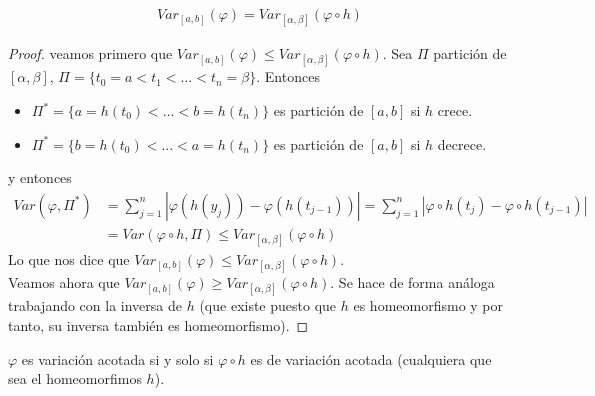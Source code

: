 \begin{obs}
\begin{enumerate}
    \begin{align*}
        Var_{[a,b]}(\varphi) = Var_{[\alpha,\beta]}(\varphi \circ h)
    \end{align*}
    \begin{proof}
    veamos primero que $Var_{[a,b]}(\varphi) \leq Var_{[\alpha,\beta]}(\varphi \circ h)$.
    Sea $\Pi$ partición de $[\alpha,\beta]$, $\Pi = \{t_0 = a < t_1 < ... < t_n = \beta\}$. Entonces
    \begin{itemize}
        \item $\Pi^* = \{ a = h(t_0) < ... < b = h(t_n) \}$ es partición de $[a,b]$ si $h$ crece.
        \item $\Pi^* = \{ b = h(t_0) < ... < a = h(t_n) \}$ es partición de $[a,b]$ si $h$ decrece.
    \end{itemize}
    y entonces
    \begin{align*}
        Var(\varphi,\Pi^*) &= \sum_{j=1}^{n}{|\varphi(h(y_j)) - \varphi(h(t_{j-1}))|} = \sum_{j=1}^{n}{|\varphi \circ h (t_j) - \varphi \circ h (t_{j-1})|} \\
        &= Var(\varphi \circ h, \Pi) \leq Var_{[\alpha,\beta]}(\varphi \circ h)
    \end{align*}
    Lo que nos dice que $Var_{[a,b]}(\varphi) \leq Var_{[\alpha,\beta]}(\varphi \circ h)$. \\
    \newline
    Veamos ahora que $Var_{[a,b]}(\varphi) \ge Var_{[\alpha,\beta]}(\varphi \circ h)$. Se hace de forma análoga trabajando con la inversa de $h$ (que existe puesto que $h$ es homeomorfismo y por tanto, su inversa también es homeomorfismo).
    \end{proof}
\end{enumerate}
\end{obs}

\begin{cor}
$\varphi$ es variación acotada si y solo si $\varphi \circ h$ es de variación acotada (cualquiera que sea el homeomorfimos $h$).
\end{cor}

